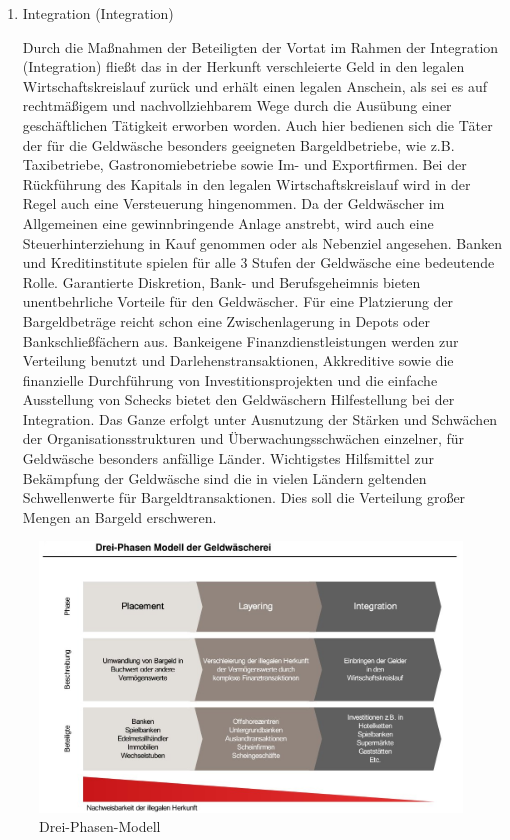 \documentclass{article}
\begin{document}
\begin{enumerate}
                    \item Integration (Integration)

                        Durch die Maßnahmen der Beteiligten der Vortat im Rahmen der Integration (Integration) fließt das in der Herkunft verschleierte Geld in den legalen Wirtschaftskreislauf zurück und erhält einen legalen Anschein, als sei es auf rechtmäßigem und nachvollziehbarem Wege durch die Ausübung einer geschäftlichen Tätigkeit erworben worden. Auch hier bedienen sich die Täter der für die Geldwäsche besonders geeigneten Bargeldbetriebe, wie z.B. Taxibetriebe, Gastronomiebetriebe sowie Im- und Exportfirmen.
                        Bei der Rückführung des Kapitals in den legalen Wirtschaftskreislauf wird in der Regel auch eine Versteuerung hingenommen. Da der Geldwäscher im Allgemeinen eine gewinnbringende Anlage anstrebt, wird auch eine Steuerhinterziehung in Kauf genommen oder als Nebenziel angesehen.
                        Banken und Kreditinstitute spielen für alle 3 Stufen der Geldwäsche eine bedeutende Rolle. Garantierte Diskretion, Bank- und Berufsgeheimnis bieten unentbehrliche Vorteile für den Geldwäscher. Für eine Platzierung der Bargeldbeträge reicht schon eine Zwischenlagerung in Depots oder Bankschließfächern aus. Bankeigene Finanzdienstleistungen werden zur Verteilung benutzt und Darlehenstransaktionen, Akkreditive sowie die finanzielle Durchführung von Investitionsprojekten und die einfache Ausstellung von Schecks bietet den Geldwäschern Hilfestellung bei der Integration. Das Ganze erfolgt unter Ausnutzung der Stärken und Schwächen der Organisationsstrukturen und Überwachungsschwächen einzelner, für Geldwäsche besonders anfällige Länder.
                        Wichtigstes Hilfsmittel zur Bekämpfung der Geldwäsche sind die in vielen Ländern geltenden Schwellenwerte für Bargeldtransaktionen. Dies soll die Verteilung großer Mengen an Bargeld erschweren.

                \end{enumerate}
               
                \begin{figure}
                    \centering
                  \includegraphics[scale=0.3]{../../turandon/data/drei_phasen_modell.png}
                    \caption{Drei-Phasen-Modell}
                    \label{fig2}
                \end{figure}
\end{document}
